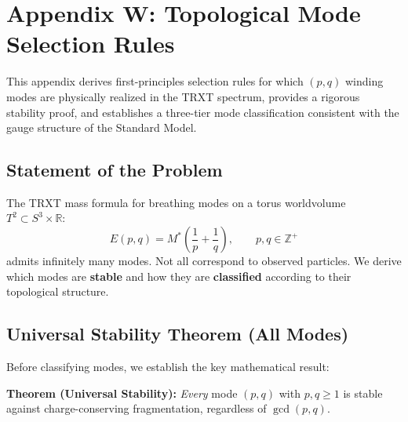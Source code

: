 \section{Appendix W: Topological Mode Selection Rules}
\label{app:mode_selection}

This appendix derives first-principles selection rules for which $(p,q)$ winding modes are physically realized in the TRXT spectrum, provides a rigorous stability proof, and establishes a three-tier mode classification consistent with the gauge structure of the Standard Model.

\subsection{Statement of the Problem}

The TRXT mass formula for breathing modes on a torus worldvolume $T^2 \subset S^3 \times \mathbb{R}$:
\begin{equation}
    E(p,q) = M^* \left( \frac{1}{p} + \frac{1}{q} \right), \qquad p,q \in \mathbb{Z}^+
    \label{eq:mode_energy}
\end{equation}
admits infinitely many modes.  Not all correspond to observed particles.  We derive which modes are \textbf{stable} and how they are \textbf{classified} according to their topological structure.

\subsection{Universal Stability Theorem (All Modes)}

Before classifying modes, we establish the key mathematical result:

\begin{mdframed}[backgroundcolor=blue!5]
\textbf{Theorem (Universal Stability):} \emph{Every} mode $(p,q)$ with $p,q \ge 1$ is stable against charge-conserving fragmentation, regardless of $\gcd(p,q)$.
\end{mdframed}

